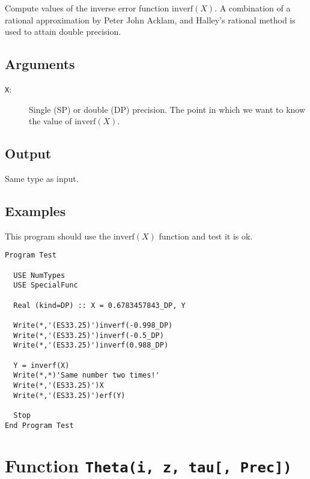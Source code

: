Compute values of the inverse error function $\text{inverf}(X)$. A
combination of a rational approximation by Peter John Acklam, and
Halley's rational method is used to attain double precision.

\subsection{Arguments}

\begin{description}
\item[\texttt{X}:] Single (SP) or double (DP) precision. The point in
  which we want to know the value of $\text{inverf}(X)$.
\end{description}

\subsection{Output}

Same type as input.

\subsection{Examples}

This program should use the $\text{inverf}(X)$ function and test it is
ok.

\begin{lstlisting}[emph=inverf,
                   emphstyle=\color{blue},
                   frame=trBL,
                   caption=Computing the Inverse Error Function.,
                   label=inverf]
Program Test

  USE NumTypes
  USE SpecialFunc

  Real (kind=DP) :: X = 0.6783457843_DP, Y

  Write(*,'(ES33.25)')inverf(-0.998_DP)
  Write(*,'(ES33.25)')inverf(-0.5_DP)
  Write(*,'(ES33.25)')inverf(0.988_DP)

  Y = inverf(X)
  Write(*,*)'Same number two times!'
  Write(*,'(ES33.25)')X
  Write(*,'(ES33.25)')erf(Y)

  Stop
End Program Test
\end{lstlisting}

\section{Function \texttt{Theta(i, z, tau[, Prec])}}

